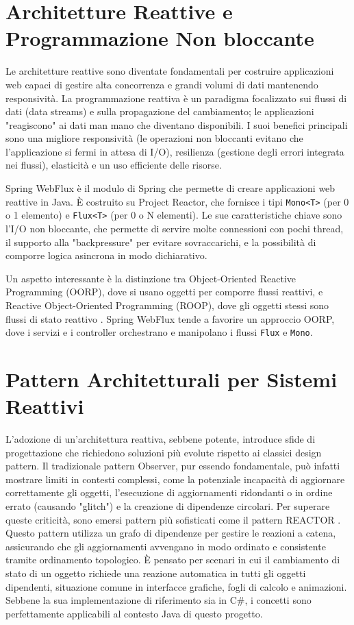 \documentclass[12pt,a4paper,openright,twoside]{book}
\begin{document}
\section{Architetture Reattive e Programmazione Non bloccante}
\label{sec:architetture_reattive}

Le architetture reattive sono diventate fondamentali per costruire applicazioni web capaci di gestire alta concorrenza e grandi volumi di dati mantenendo responsività. La programmazione reattiva è un paradigma focalizzato sui flussi di dati (data streams) e sulla propagazione del cambiamento; le applicazioni "reagiscono" ai dati man mano che diventano disponibili. I suoi benefici principali sono una migliore responsività (le operazioni non bloccanti evitano che l'applicazione si fermi in attesa di I/O), resilienza (gestione degli errori integrata nei flussi), elasticità e un uso efficiente delle risorse.

Spring WebFlux è il modulo di Spring che permette di creare applicazioni web reattive in Java. È costruito su Project Reactor, che fornisce i tipi \texttt{Mono<T>} (per 0 o 1 elemento) e \texttt{Flux<T>} (per 0 o N elementi). Le sue caratteristiche chiave sono l'I/O non bloccante, che permette di servire molte connessioni con pochi thread, il supporto alla "backpressure" per evitare sovraccarichi, e la possibilità di comporre logica asincrona in modo dichiarativo.

Un aspetto interessante è la distinzione tra Object-Oriented Reactive Programming (OORP), dove si usano oggetti per comporre flussi reattivi, e Reactive Object-Oriented Programming (ROOP), dove gli oggetti stessi sono flussi di stato reattivo \cite{Boix2013OORP}. Spring WebFlux tende a favorire un approccio OORP, dove i servizi e i controller orchestrano e manipolano i flussi \texttt{Flux} e \texttt{Mono}.

\section{Pattern Architetturali per Sistemi Reattivi}
\label{sec:pattern_reattivi}

L'adozione di un'architettura reattiva, sebbene potente, introduce sfide di progettazione che richiedono soluzioni più evolute rispetto ai classici design pattern. Il tradizionale pattern Observer, pur essendo fondamentale, può infatti mostrare limiti in contesti complessi, come la potenziale incapacità di aggiornare correttamente gli oggetti, l'esecuzione di aggiornamenti ridondanti o in ordine errato (causando "glitch") e la creazione di dipendenze circolari. Per superare queste criticità, sono emersi pattern più sofisticati come il pattern REACTOR \cite{Mijac2021Reactor}. Questo pattern utilizza un grafo di dipendenze per gestire le reazioni a catena, assicurando che gli aggiornamenti avvengano in modo ordinato e consistente tramite ordinamento topologico. È pensato per scenari in cui il cambiamento di stato di un oggetto richiede una reazione automatica in tutti gli oggetti dipendenti, situazione comune in interfacce grafiche, fogli di calcolo e animazioni. Sebbene la sua implementazione di riferimento sia in C\#, i concetti sono perfettamente applicabili al contesto Java di questo progetto.
\end{document}
